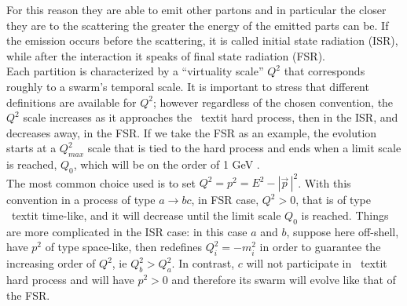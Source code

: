 For this reason they are able to emit other partons and in particular the closer they are to the scattering the greater the energy of the emitted parts can be. If the emission occurs before the scattering, it is called initial state radiation (ISR), while after the interaction it speaks of final state radiation (FSR). \\
Each partition is characterized by a  ``virtuality scale'' $Q^2$ that corresponds roughly to a swarm's temporal scale.
It is important to stress that different definitions are available for $Q^2$; however regardless of the chosen convention, the $ Q^2 $ scale increases as it approaches the \ textit {hard process}, then in the ISR, and decreases away, in the FSR. If we take the FSR as an example, the evolution starts at a $ Q^2_ {max} $ scale that is tied to the hard process and ends when a limit scale is reached, $ Q_0 $, which will be on the order of 1 GeV .\\
The most common choice used is to set  $Q^2=p^2=E^2- |\vec{p}\,|^2$. With this convention in a process of type  $a \rightarrow bc$, in FSR case, $Q^2 >0$, that is of type \ textit {time-like}, and it will decrease until the limit scale $ Q_0 $ is reached.
Things are more complicated in the ISR case: in this case $ a $ and $ b $, suppose here off-shell, have $ p^2 $ of type space-like, then redefines $ Q_i^2 = -m_i^2 $ in order to guarantee the increasing order of $ Q^2 $, ie $ Q_b^2> Q_a^2 $.
In contrast, $ c $ will not participate in \ textit {hard process} and will have $ p^2> 0 $ and therefore its swarm will evolve like that of the FSR.

